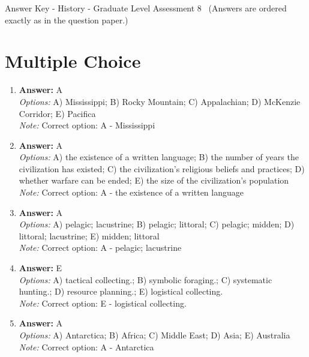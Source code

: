 \documentclass[12pt]{article}
\begin{document}
\begin{center}
Answer Key - History - Graduate Level Assessment 8 \
\small (Answers are ordered exactly as in the question paper.)
\end{center}

\section*{Multiple Choice}
\begin{enumerate}[label=\arabic*.]
\item \textbf{Answer:} A
\\ \textit{Options:} A) Mississippi; B) Rocky Mountain; C) Appalachian; D) McKenzie Corridor; E) Pacifica
\\ \textit{Note:} Correct option: A - Mississippi
\item \textbf{Answer:} A
\\ \textit{Options:} A) the existence of a written language; B) the number of years the civilization has existed; C) the civilization's religious beliefs and practices; D) whether warfare can be ended; E) the size of the civilization's population
\\ \textit{Note:} Correct option: A - the existence of a written language
\item \textbf{Answer:} A
\\ \textit{Options:} A) pelagic; lacustrine; B) pelagic; littoral; C) pelagic; midden; D) littoral; lacustrine; E) midden; littoral
\\ \textit{Note:} Correct option: A - pelagic; lacustrine
\item \textbf{Answer:} E
\\ \textit{Options:} A) tactical collecting.; B) symbolic foraging.; C) systematic hunting.; D) resource planning.; E) logistical collecting.
\\ \textit{Note:} Correct option: E - logistical collecting.
\item \textbf{Answer:} A
\\ \textit{Options:} A) Antarctica; B) Africa; C) Middle East; D) Asia; E) Australia
\\ \textit{Note:} Correct option: A - Antarctica
\end{enumerate}
\end{document}
